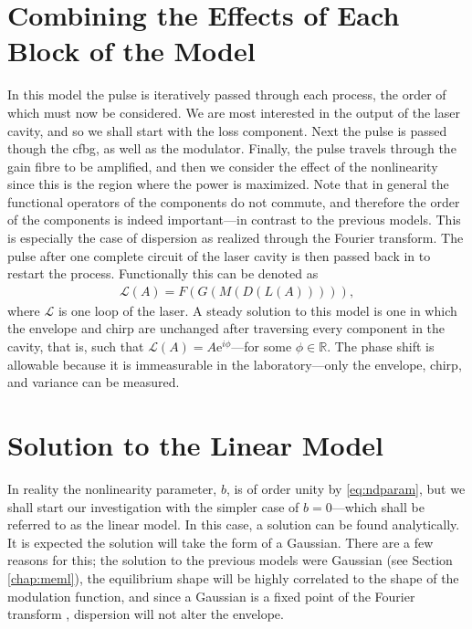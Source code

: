 \section{Combining the Effects of Each Block of the Model}
\label{sec:effects}
In this model the pulse is iteratively passed through each process, the order of which must now be considered. We are most interested in the output of the laser cavity, and so we shall start with the loss component. Next the pulse is passed though the \gls{cfbg}, as well as the modulator. Finally, the pulse travels through the gain fibre to be amplified, and then we consider the effect of the nonlinearity since this is the region where the power is maximized. Note that in general the functional operators of the components do not commute, and therefore the order of the components is indeed important---in contrast to the previous models. This is especially the case of dispersion as realized through the Fourier transform. The pulse after one complete circuit of the laser cavity is then passed back in to restart the process. Functionally this can be denoted as
\begin{align}
	\mathcal{L}(A) = F(G(M(D(L(A))))),
\end{align}
where $\mathcal{L}$ is one loop of the laser. A steady solution to this model is one in which the envelope and chirp are unchanged after traversing every component in the cavity, that is, such that $\mathcal{L}(A) = A \textrm{e}^{i \phi}$---for some $\phi \in \mathbb{R}$. The phase shift is allowable because it is immeasurable in the laboratory---only the envelope, chirp, and variance can be measured.

\section{Solution to the Linear Model}
\label{sec:linear}
In reality the nonlinearity parameter, $b$, is of order unity by \eqref{eq:ndparam}, but we shall start our investigation with the simpler case of $b = 0$---which shall be referred to as the linear model. In this case, a solution can be found analytically. It is expected the solution will take the form of a Gaussian. There are a few reasons for this; the solution to the previous models were Gaussian \cite{cutler, siegman, kuizenga1970a, martinez1984, martinez1985} (see Section \ref{chap:meml}), the equilibrium shape will be highly correlated to the shape of the modulation function, and since a Gaussian is a fixed point of the Fourier transform \cite{gradshteyn}, dispersion will not alter the envelope. \\


